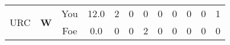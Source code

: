 \documentclass[a4paper,12pt]{article}
\begin{document}
\begin{tabular}[t]{| c | c | c | c | c | c | c | c | c | c | c | c
      |}
        \hline
        \multirow{2}{*}{  URC
             } &
              \multirow{2}{*}{  \textbf{W}  } & 
                    \cellcolor{yellow!25} You & \cellcolor{yellow!25} 12.0 & \cellcolor{yellow!25} 2 &
                    \cellcolor{yellow!25} 0 & \cellcolor{yellow!25} 0 & \cellcolor{yellow!25} 0 &
                    \cellcolor{yellow!25} 0 & \cellcolor{yellow!25} 0 & \cellcolor{yellow!25} 0 &
                    \cellcolor{yellow!25} 1 \\
                    \cline{3-12}
                    & & \cellcolor{red!15} Foe & \cellcolor{red!15} 0.0 & \cellcolor{red!15} 0 & \cellcolor{red!15}
                    0 & \cellcolor{red!15} 2
                    & \cellcolor{red!15} 0 & \cellcolor{red!15}
                    0 & \cellcolor{red!15} 0 
                    & \cellcolor{red!15} 0 & \cellcolor{red!15}
                    0 \\
                    
                      
                        \hline
                      \end{tabular}
                      
\end{document}
